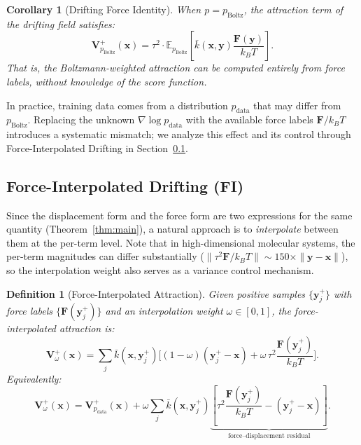 \documentclass[11pt]{article}
\newtheorem{corollary}[theorem]{Corollary}
\newtheorem{definition}{Definition}[section]
\newcommand{\bx}{\mathbf{x}}
\newcommand{\by}{\mathbf{y}}
\newcommand{\bV}{\mathbf{V}}
\newcommand{\bF}{\mathbf{F}}
\newcommand{\E}{\mathbb{E}}
\newcommand{\kbar}{\bar{k}}
\newcommand{\pboltz}{p_{\text{Boltz}}}
\newcommand{\pdata}{p_{\text{data}}}
\newcommand{\kBT}{k_BT}
\begin{document}
\begin{corollary}[Drifting Force Identity]
\label{cor:decomposition}
When $p = \pboltz$, the attraction term of the drifting field satisfies:
\begin{equation}
    \bV_{\pboltz}^+(\bx) = \tau^2 \cdot \E_{\pboltz}\!\left[\kbar(\bx,\by)\frac{\bF(\by)}{\kBT}\right].
    \label{eq:force-attraction}
\end{equation}
That is, the Boltzmann-weighted attraction can be computed entirely from force labels, without knowledge of the score function.
\end{corollary}

In practice, training data comes from a distribution $\pdata$ that may differ from $\pboltz$.
Replacing the unknown $\nabla \log \pdata$ with the available force labels $\bF/\kBT$ introduces a systematic mismatch; we analyze this effect and its control through Force-Interpolated Drifting in Section~\ref{sec:force-interp}.

\subsection{Force-Interpolated Drifting (FI)}
\label{sec:force-interp}

Since the displacement form and the force form are two expressions for the same quantity (Theorem~\ref{thm:main}), a natural approach is to \emph{interpolate} between them at the per-term level.
Note that in high-dimensional molecular systems, the per-term magnitudes can differ substantially ($\|\tau^2 \bF/\kBT\| \sim 150\times \|\by - \bx\|$), so the interpolation weight also serves as a variance control mechanism.

\begin{definition}[Force-Interpolated Attraction]
\label{def:force-interp}
Given positive samples $\{\by_j^+\}$ with force labels $\{\bF(\by_j^+)\}$ and an interpolation weight $\omega \in [0,1]$, the force-interpolated attraction is:
\begin{equation}
    \bV_\omega^+(\bx) = \sum_j \kbar(\bx,\by_j^+)\Big[(1-\omega)(\by_j^+ - \bx) + \omega\,\tau^2\frac{\bF(\by_j^+)}{\kBT}\Big].
    \label{eq:force-interp}
\end{equation}
Equivalently:
\begin{equation}
    \bV_\omega^+(\bx) = \bV_{\pdata}^+(\bx) + \omega\sum_j \kbar(\bx,\by_j^+)\underbrace{\left[\tau^2\frac{\bF(\by_j^+)}{\kBT} - (\by_j^+ - \bx)\right]}_{\text{force--displacement residual}}.
    \label{eq:force-interp-residual}
\end{equation}
\end{definition}
\end{document}
